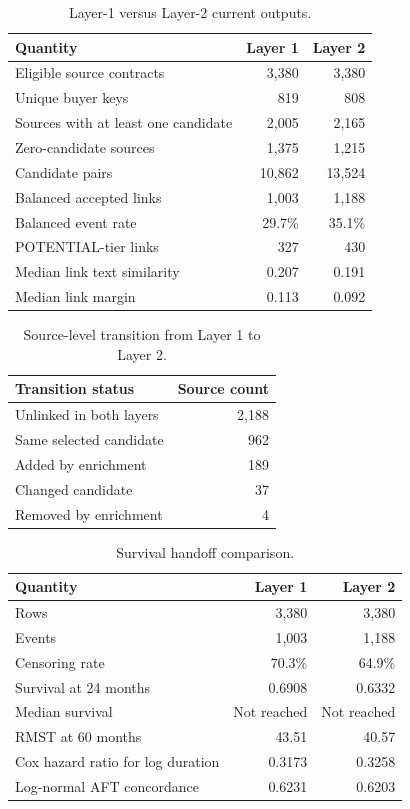 \documentclass[11pt]{article}
\begin{document}
\begin{table}[h!]
\centering
\caption{Layer-1 versus Layer-2 current outputs.}
\begin{tabular}{lrr}
\toprule
Quantity & Layer 1 & Layer 2 \\
\midrule
Eligible source contracts & 3{,}380 & 3{,}380 \\
Unique buyer keys & 819 & 808 \\
Sources with at least one candidate & 2{,}005 & 2{,}165 \\
Zero-candidate sources & 1{,}375 & 1{,}215 \\
Candidate pairs & 10{,}862 & 13{,}524 \\
Balanced accepted links & 1{,}003 & 1{,}188 \\
Balanced event rate & 29.7\% & 35.1\% \\
POTENTIAL-tier links & 327 & 430 \\
Median link text similarity & 0.207 & 0.191 \\
Median link margin & 0.113 & 0.092 \\
\bottomrule
\end{tabular}
\end{table}

\begin{table}[h!]
\centering
\caption{Source-level transition from Layer 1 to Layer 2.}
\begin{tabular}{lr}
\toprule
Transition status & Source count \\
\midrule
Unlinked in both layers & 2{,}188 \\
Same selected candidate & 962 \\
Added by enrichment & 189 \\
Changed candidate & 37 \\
Removed by enrichment & 4 \\
\bottomrule
\end{tabular}
\end{table}

\begin{table}[h!]
\centering
\caption{Survival handoff comparison.}
\begin{tabular}{lrr}
\toprule
Quantity & Layer 1 & Layer 2 \\
\midrule
Rows & 3{,}380 & 3{,}380 \\
Events & 1{,}003 & 1{,}188 \\
Censoring rate & 70.3\% & 64.9\% \\
Survival at 24 months & 0.6908 & 0.6332 \\
Median survival & Not reached & Not reached \\
RMST at 60 months & 43.51 & 40.57 \\
Cox hazard ratio for log duration & 0.3173 & 0.3258 \\
Log-normal AFT concordance & 0.6231 & 0.6203 \\
\bottomrule
\end{tabular}
\end{table}
\end{document}
